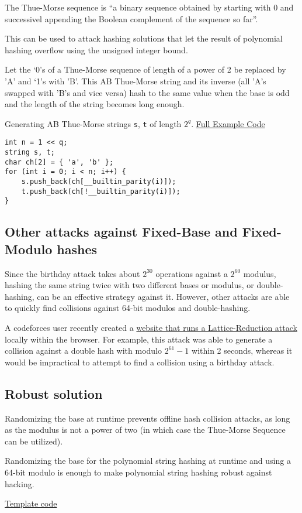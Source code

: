 \documentclass[12pt,a4paper]{article}
\begin{document}
The Thue-Morse sequence is ``a binary sequence obtained by starting with
0 and successivel appending the Boolean complement of the sequence so
far''.\cite{Wikipedia_2024}

This can be used to attack hashing solutions that let the result of
polynomial hashing overflow using the unsigned integer bound. 

Let the `0's of a Thue-Morse sequence of length of a power of 2 be replaced 
by 'A' and `1's with 'B'. This AB Thue-Morse string and its inverse (all 'A's
swapped with 'B's and vice versa) hash to the same value when the base
is odd and the length of the string becomes long enough.

\noindent Generating AB Thue-Morse strings \texttt{s}, \texttt{t} of length
\(2^q\).
\href{https://github.com/takeuchi-masaki/hacking-hashing/blob/main/string-collision/thue_morse_attack.cpp}{Full
    Example Code}

\begin{verbatim}
int n = 1 << q;
string s, t;
char ch[2] = { 'a', 'b' };
for (int i = 0; i < n; i++) {
    s.push_back(ch[__builtin_parity(i)]);
    t.push_back(ch[!__builtin_parity(i)]);
}
\end{verbatim}

\subsection{Other attacks against Fixed-Base and Fixed-Modulo
    hashes}\label{other-attacks-against-fixed-base-fixed-modulo-hashes}

Since the birthday attack takes about \(2^{30}\) operations against a
\(2^{60}\) modulus, hashing the same string twice with two different bases
or modulus, or double-hashing, can be an effective strategy against it. 
However, other attacks are able to quickly find collisions against 
64-bit modulos and double-hashing.

A codeforces user recently created a
\href{https://codeforces.com/blog/entry/129538}{website that runs a
    Lattice-Reduction attack} locally within the browser. For example, this
attack was able to generate a collision against a double hash with
modulo \(2^{61} - 1\) within 2 seconds, whereas it would be impractical
to attempt to find a collision using a birthday attack.

\subsection{Robust solution}\label{robust-solution-1}
Randomizing the base at runtime prevents offline hash collision attacks, as long
as the modulus is not a power of two (in which case the Thue-Morse Sequence can be utilized).

Randomizing the base for the polynomial string hashing at runtime and using a 64-bit modulo is enough to make polynomial string hashing robust against hacking.

\href{https://github.com/takeuchi-masaki/hacking-hashing/blob/main/string-collision/saferabinkarp.cpp}{Template code}

\printbibliography
\end{document}
